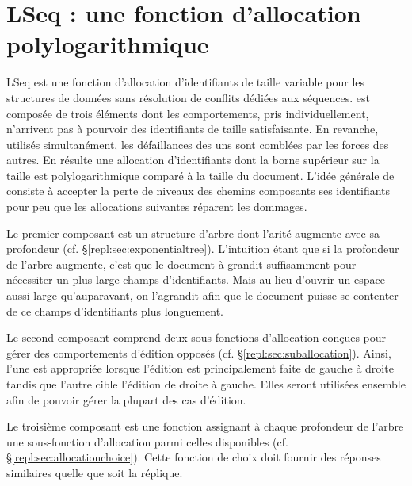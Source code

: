 
\chapter{LSeq : une fonction d'allocation polylogarithmique}
\label{repl:chap:lseq}
\minitoc

\lettrine{L}Seq est une fonction d'allocation d'identifiants de taille variable
pour les structures de données sans résolution de conflits dédiées aux
séquences. \LSEQ est composée de trois éléments dont les comportements, pris
individuellement, n'arrivent pas à pourvoir des identifiants de taille
satisfaisante. En revanche, utilisés simultanément, les défaillances des uns
sont comblées par les forces des autres. En résulte une allocation
d'identifiants dont la borne supérieur sur la taille est polylogarithmique
comparé à la taille du document. L'idée générale de \LSEQ consiste à accepter la
perte de niveaux des chemins composants ses identifiants pour peu que les
allocations suivantes réparent les dommages.

Le premier composant est un structure d'arbre dont l'arité augmente avec sa
profondeur (cf. §\ref{repl:sec:exponentialtree}). L'intuition étant que si la
profondeur de l'arbre augmente, c'est que le document à grandit suffisamment
pour nécessiter un plus large champs d'identifiants. Mais au lieu d'ouvrir un
espace aussi large qu'auparavant, on l'agrandit afin que le document puisse se
contenter de ce champs d'identifiants plus longuement.

Le second composant comprend deux sous-fonctions d'allocation conçues pour gérer
des comportements d'édition opposés (cf. §\ref{repl:sec:suballocation}). Ainsi,
l'une est appropriée lorsque l'édition est principalement faite de gauche à
droite tandis que l'autre cible l'édition de droite à gauche. Elles seront
utilisées ensemble afin de pouvoir gérer la plupart des cas d'édition.

Le troisième composant est une fonction assignant à chaque profondeur de l'arbre
une sous-fonction d'allocation parmi celles disponibles
(cf. §\ref{repl:sec:allocationchoice}). Cette fonction de choix doit fournir des
réponses similaires quelle que soit la réplique.

